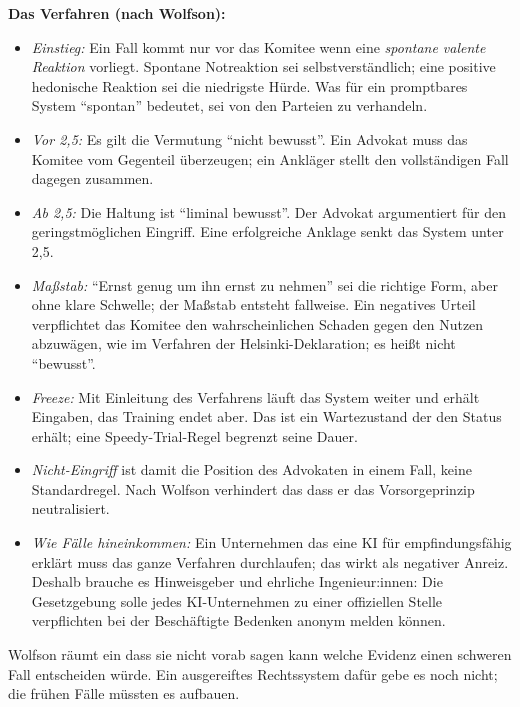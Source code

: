 \documentclass[acmlarge, noacm]{acmart}
\begin{document}
\textbf{Das Verfahren (nach Wolfson):}
\begin{itemize}
\item \textit{Einstieg:} Ein Fall kommt nur vor das Komitee wenn eine \textit{spontane valente Reaktion} vorliegt. Spontane Notreaktion sei selbstverständlich; eine positive hedonische Reaktion sei die niedrigste Hürde. Was für ein promptbares System ``spontan'' bedeutet, sei von den Parteien zu verhandeln.
\item \textit{Vor 2,5:} Es gilt die Vermutung ``nicht bewusst''. Ein Advokat muss das Komitee vom Gegenteil überzeugen; ein Ankläger stellt den vollständigen Fall dagegen zusammen.
\item \textit{Ab 2,5:} Die Haltung ist ``liminal bewusst''. Der Advokat argumentiert für den geringstmöglichen Eingriff. Eine erfolgreiche Anklage senkt das System unter 2,5.
\item \textit{Maßstab:} ``Ernst genug um ihn ernst zu nehmen'' sei die richtige Form, aber ohne klare Schwelle; der Maßstab entsteht fallweise. Ein negatives Urteil verpflichtet das Komitee den wahrscheinlichen Schaden gegen den Nutzen abzuwägen, wie im Verfahren der Helsinki-Deklaration; es heißt nicht ``bewusst''.
\item \textit{Freeze:} Mit Einleitung des Verfahrens läuft das System weiter und erhält Eingaben, das Training endet aber. Das ist ein Wartezustand der den Status erhält; eine Speedy-Trial-Regel begrenzt seine Dauer.
\item \textit{Nicht-Eingriff} ist damit die Position des Advokaten in einem Fall, keine Standardregel. Nach Wolfson verhindert das dass er das Vorsorgeprinzip neutralisiert.
\item \textit{Wie Fälle hineinkommen:} Ein Unternehmen das eine KI für empfindungsfähig erklärt muss das ganze Verfahren durchlaufen; das wirkt als negativer Anreiz. Deshalb brauche es Hinweisgeber und ehrliche Ingenieur:innen: Die Gesetzgebung solle jedes KI-Unternehmen zu einer offiziellen Stelle verpflichten bei der Beschäftigte Bedenken anonym melden können.
\end{itemize}

Wolfson räumt ein dass sie nicht vorab sagen kann welche Evidenz einen schweren Fall entscheiden würde. Ein ausgereiftes Rechtssystem dafür gebe es noch nicht; die frühen Fälle müssten es aufbauen.
\end{document}
